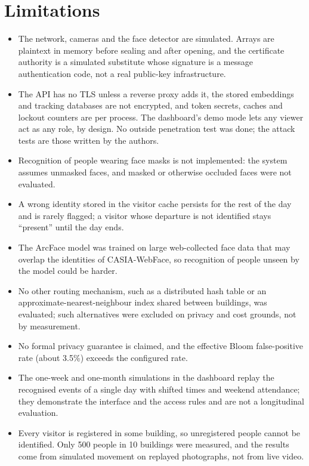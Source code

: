 \documentclass[12pt,a4paper,oneside]{report}
\begin{document}
\section{Limitations}
\begin{itemize}
\item The network, cameras and the face detector are simulated. Arrays are plaintext in memory before sealing and after opening, and the certificate authority is a simulated substitute whose signature is a message authentication code, not a real public-key infrastructure.
\item The API has no TLS unless a reverse proxy adds it, the stored embeddings and tracking databases are not encrypted, and token secrets, caches and lockout counters are per process. The dashboard's demo mode lets any viewer act as any role, by design. No outside penetration test was done; the attack tests are those written by the authors.
\item Recognition of people wearing face masks is not implemented: the system assumes unmasked faces, and masked or otherwise occluded faces were not evaluated.
\item A wrong identity stored in the visitor cache persists for the rest of the day and is rarely flagged; a visitor whose departure is not identified stays ``present'' until the day ends.
\item The ArcFace model was trained on large web-collected face data that may overlap the identities of CASIA-WebFace, so recognition of people unseen by the model could be harder.
\item No other routing mechanism, such as a distributed hash table or an approximate-nearest-neighbour index shared between buildings, was evaluated; such alternatives were excluded on privacy and cost grounds, not by measurement.
\item No formal privacy guarantee is claimed, and the effective Bloom false-positive rate (about 3.5\%) exceeds the configured rate.
\item The one-week and one-month simulations in the dashboard replay the recognised events of a single day with shifted times and weekend attendance; they demonstrate the interface and the access rules and are not a longitudinal evaluation.
\item Every visitor is registered in some building, so unregistered people cannot be identified. Only 500 people in 10 buildings were measured, and the results come from simulated movement on replayed photographs, not from live video.
\end{itemize}
\end{document}
